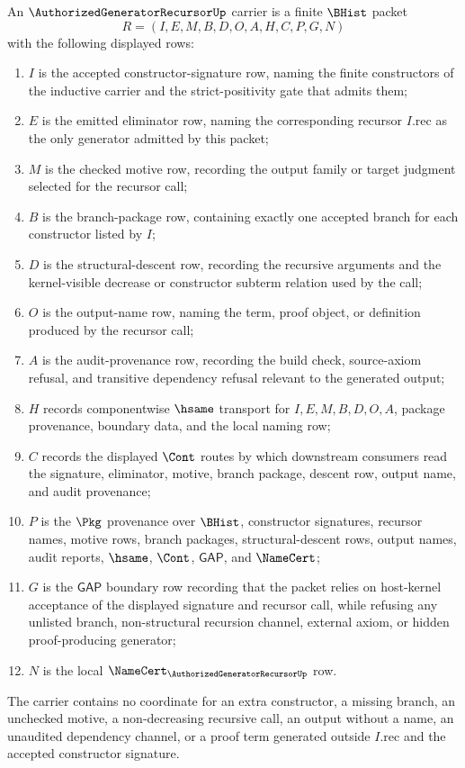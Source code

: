 \begin{definition}
\label{def:authorized-generator-recursor-carrier}
An $\AuthorizedGeneratorRecursorUp$ carrier is a finite $\BHist$ packet
$$
R=(I,E,M,B,D,O,A,H,C,P,G,N)
$$
with the following displayed rows:
\begin{enumerate}
\item $I$ is the accepted constructor-signature row, naming the finite constructors of the inductive carrier and the strict-positivity gate that admits them;
\item $E$ is the emitted eliminator row, naming the corresponding recursor $I.\mathrm{rec}$ as the only generator admitted by this packet;
\item $M$ is the checked motive row, recording the output family or target judgment selected for the recursor call;
\item $B$ is the branch-package row, containing exactly one accepted branch for each constructor listed by $I$;
\item $D$ is the structural-descent row, recording the recursive arguments and the kernel-visible decrease or constructor subterm relation used by the call;
\item $O$ is the output-name row, naming the term, proof object, or definition produced by the recursor call;
\item $A$ is the audit-provenance row, recording the build check, source-axiom refusal, and transitive dependency refusal relevant to the generated output;
\item $H$ records componentwise $\hsame$ transport for $I,E,M,B,D,O,A$, package provenance, boundary data, and the local naming row;
\item $C$ records the displayed $\Cont$ routes by which downstream consumers read the signature, eliminator, motive, branch package, descent row, output name, and audit provenance;
\item $P$ is the $\Pkg$ provenance over $\BHist$, constructor signatures, recursor names, motive rows, branch packages, structural-descent rows, output names, audit reports, $\hsame$, $\Cont$, $\mathsf{GAP}$, and $\NameCert$;
\item $G$ is the $\mathsf{GAP}$ boundary row recording that the packet relies on host-kernel acceptance of the displayed signature and recursor call, while refusing any unlisted branch, non-structural recursion channel, external axiom, or hidden proof-producing generator;
\item $N$ is the local $\NameCert_{\AuthorizedGeneratorRecursorUp}$ row.
\end{enumerate}
The carrier contains no coordinate for an extra constructor, a missing branch, an unchecked motive, a non-decreasing recursive call, an output without a name, an unaudited dependency channel, or a proof term generated outside $I.\mathrm{rec}$ and the accepted constructor signature.
\end{definition}

